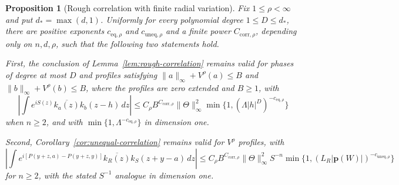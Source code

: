 \documentclass[11pt]{article}
\numberwithin{equation}{section}
\newtheorem{proposition}[theorem]{Proposition}
\theoremstyle{remark}
\theoremstyle{definition}
\begin{document}
\begin{proposition}[Rough correlation with finite radial variation]
\label{prop:allq-rough-correlation}
Fix $1\le\rho<\infty$ and put $d_*=\max(d,1)$. Uniformly for
every polynomial degree $1\le D\le d_*$, there are positive exponents
$c_{\mathrm{eq},\rho}$ and $c_{\mathrm{uneq},\rho}$ and a finite power
$C_{\mathrm{corr},\rho}$, depending only on $n,d,\rho$, such that the
following two statements hold.

First, the conclusion of Lemma~\ref{lem:rough-correlation} remains valid
for phases of degree at most $D$ and profiles satisfying
$\|a\|_\infty+V^\rho(a)\le B$ and
$\|b\|_\infty+V^\rho(b)\le B$, where the profiles are zero extended and
$B\ge1$, with
\begin{equation}\label{eq:allq-equal-correlation}
 \left|\int e^{iS(z)}\overline{k_a(z)}k_b(z-h)\,dz\right|
 \le C_\rho B^{C_{\mathrm{corr},\rho}}\|\Theta\|_\infty^2
 \min\{1,(\Lambda|h|^D)^{-c_{\mathrm{eq},\rho}}\}
\end{equation}
when $n\ge2$, and with
$\min\{1,\Lambda^{-c_{\mathrm{eq},\rho}}\}$ in dimension one.

Second, Corollary~\ref{cor:unequal-correlation} remains valid for
$V^\rho$ profiles, with
\begin{equation}\label{eq:allq-unequal-correlation}
 \left|\int e^{i[P(y+z,a)-P(y+z,y)]}
 \overline{k_R(z)}k_S(z+y-a)\,dz\right|
 \le C_\rho B^{C_{\mathrm{corr},\rho}}\|\Theta\|_\infty^2S^{-n}
 \min\{1,(L_R|\mathbf p(W)|)^{-c_{\mathrm{uneq},\rho}}\}
\end{equation}
for $n\ge2$, with the stated $S^{-1}$ analogue in dimension one.
\end{proposition}
\end{document}
